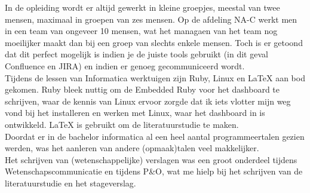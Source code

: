 \documentclass[10pt,a4paper]{article}
\begin{document}
In de opleiding wordt er altijd gewerkt in kleine groepjes, meestal van twee mensen, maximaal in groepen van zes mensen. Op de afdeling NA-C werkt men in een team van ongeveer 10 mensen, wat het managaen van het team nog moeilijker maakt dan bij een groep van slechts enkele mensen. Toch is er getoond dat dit perfect mogelijk is indien je de juiste tools gebruikt (in dit geval Confluence en JIRA) en indien er genoeg gecommuniceerd wordt.\\
Tijdens de lessen van Informatica werktuigen zijn Ruby, Linux en LaTeX aan bod gekomen. Ruby bleek nuttig om de Embedded Ruby voor het dashboard te schrijven, waar de kennis van Linux ervoor zorgde dat ik iets vlotter mijn weg vond bij het installeren en werken met Linux, waar het dashboard in is ontwikkeld. LaTeX is gebruikt om de literatuurstudie te maken.\\
Doordat er in de bachelor informatica al een heel aantal programmeertalen gezien werden, was het aanleren van andere (opmaak)talen veel makkelijker. \\
Het schrijven van (wetenschappelijke) verslagen was een groot onderdeel tijdens Wetenschapscommunicatie en tijdens P\&O, wat me hielp bij het schrijven van de literatuurstudie en het stageverslag. 
\end{document}
